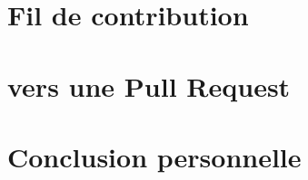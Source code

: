 \documentclass[a4paper, 11pt]{article}
\begin{document}
\section*{Fil de contribution}
\section*{vers une Pull Request}
\section*{Conclusion personnelle}
\end{document}
